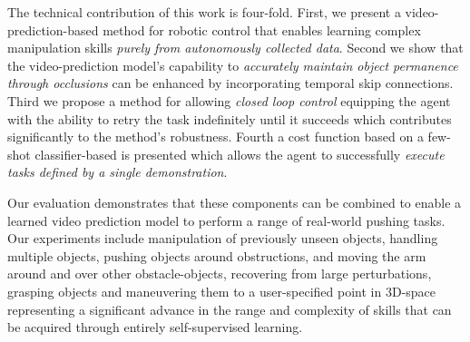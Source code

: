 
The technical contribution of this work is four-fold. First, we present a video-prediction-based method for robotic control that enables learning complex manipulation skills \emph{purely from autonomously collected data}. Second we show that the video-prediction model's capability to \emph{accurately maintain object permanence through occlusions} can be enhanced by incorporating temporal skip connections. Third we propose a method for allowing \emph{closed loop control} equipping the agent with the ability to retry the task indefinitely until it succeeds which contributes significantly to the method's robustness. Fourth a cost function based on a few-shot classifier-based is presented which allows the agent to successfully \emph{execute tasks defined by a single demonstration}.

Our evaluation demonstrates that these components can be combined to enable a learned video prediction model to perform a range of real-world pushing tasks. Our experiments include manipulation of previously unseen objects, handling multiple objects, pushing objects around obstructions, and moving the arm around and over other obstacle-objects, recovering from large perturbations, grasping objects and maneuvering them to a user-specified point in 3D-space representing a significant advance in the range and complexity of skills that can be acquired through entirely self-supervised learning.

\fi

 





